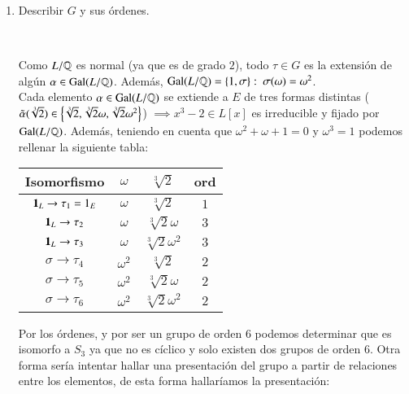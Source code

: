 \begin{eg}
\begin{enumerate}
        \item Describir $G$ y sus órdenes.\\
        \begin{center}
            \\
        \end{center}
        Como $L/\mathbb{Q}$ es normal (ya que es de grado $2$), todo $\tau \in G$ es la extensión de algún $\alpha \in \mathrm{Gal}(L/\mathbb{Q})$. Además, $\mathrm{Gal}(L/\mathbb{Q}) = \left\{1, \sigma\right\}:\ \sigma(\omega) = \omega^2$.\\
        Cada elemento $\alpha \in \mathrm{Gal}(L/\mathbb{Q})$ se extiende a $E$ de tres formas distintas ($\tilde\alpha(\sqrt[3]{2}) \in \left\{\sqrt[3]{2}, \sqrt[3]{2}\omega, \sqrt[3]{2}\omega^2\right\}$) $\implies x^3-2 \in L[x]$ es irreducible y fijado por $\mathrm{Gal}(L/\mathbb{Q})$.
        Además, teniendo en cuenta que $\omega^2+\omega+1 = 0$ y $\omega^3 = 1$ podemos rellenar la siguiente tabla:
        \begin{center}
            \begin{tabular}{|c||c|c|c|}
            \hline
            Isomorfismo                 & $\omega$   & $\sqrt[3]{2}$         & ord\\ \hline \hline
            $\mathbf{1}_L   \rightarrow \tau_1 = 1_E$ & $\omega$   & $\sqrt[3]{2}$         & $1$\\ \hline
            $\mathbf{1}_L   \rightarrow \tau_2$       & $\omega$   & $\sqrt[3]{2}\omega$   & $3$\\ \hline
            $\mathbf{1}_L   \rightarrow \tau_3$       & $\omega$   & $\sqrt[3]{2}\omega^2$ & $3$\\ \hline
            $\sigma \rightarrow \tau_4$       & $\omega^2$ & $\sqrt[3]{2}$         & $2$\\ \hline
            $\sigma \rightarrow \tau_5$       & $\omega^2$ & $\sqrt[3]{2}\omega$   & $2$\\ \hline
            $\sigma \rightarrow \tau_6$       & $\omega^2$ & $\sqrt[3]{2}\omega^2$ & $2$\\ \hline
            \end{tabular}
        \end{center}
        Por los órdenes, y por ser un grupo de orden $6$ podemos determinar que es isomorfo a $S_3$ ya que no es cíclico y solo existen dos grupos de orden $6$. Otra forma sería intentar hallar una presentación del grupo a partir de relaciones entre los elementos, de esta forma hallaríamos la presentación:

\end{enumerate}
\end{eg}
